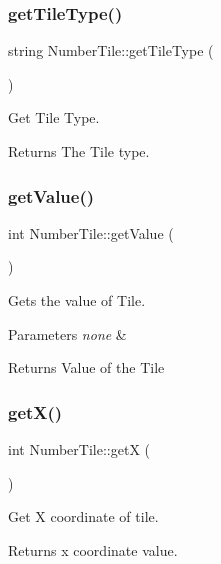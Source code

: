\subsubsection{\texorpdfstring{get\+Tile\+Type()}{getTileType()}}
{\footnotesize\ttfamily string Number\+Tile\+::get\+Tile\+Type (\begin{DoxyParamCaption}{ }\end{DoxyParamCaption})}

Get Tile Type.

\begin{DoxyReturn}{Returns}
The Tile type. 
\end{DoxyReturn}
\mbox{\label{classNumberTile_a7a870508ad2bfbf3e5de48b49db58a56}} 
\subsubsection{\texorpdfstring{get\+Value()}{getValue()}}
{\footnotesize\ttfamily int Number\+Tile\+::get\+Value (\begin{DoxyParamCaption}{ }\end{DoxyParamCaption})}

Gets the value of Tile.


\begin{DoxyParams}{Parameters}
{\em none} & \\
\hline
\end{DoxyParams}
\begin{DoxyReturn}{Returns}
Value of the Tile 
\end{DoxyReturn}
\mbox{\label{classNumberTile_a20819d16d4d00620c81cd44a56a6452b}} 
\subsubsection{\texorpdfstring{get\+X()}{getX()}}
{\footnotesize\ttfamily int Number\+Tile\+::getX (\begin{DoxyParamCaption}{ }\end{DoxyParamCaption})}

Get X coordinate of tile.

\begin{DoxyReturn}{Returns}
x coordinate value. 
\end{DoxyReturn}
\mbox{\label{classNumberTile_a9c827ee17536bc5f0caeca36c7f6e48c}} 

